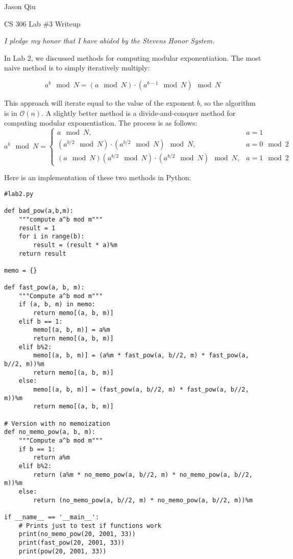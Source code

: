 \documentclass[a4paper,10pt]{article}
\begin{document}
Jason Qiu

CS 306 Lab $\#3$ Writeup

\emph{I pledge my honor that I have abided by the Stevens Honor System.}

In Lab 2, we discussed methods for computing modular exponentiation. The most naive method is to simply iteratively multiply:

$$a^b \mod N = (a \mod N) \cdot (a^{b-1} \mod N) \mod N$$

This approach will iterate equal to the value of the exponent $b$, so the algorithm is in $\mathcal{O}(n)$. A slightly better method is a divide-and-conquer method for computing modular exponentiation. The process is as follows:
\begin{equation*}
a^b \mod N = 
\begin{cases}
	a \mod N, & a = 1\\
	(a^{b/2} \mod N) \cdot (a^{b/2} \mod N) \mod N, & a = 0 \mod 2\\
	(a \mod N)(a^{b/2} \mod N) \cdot (a^{b/2} \mod N) \mod N, & a = 1 \mod 2
\end{cases}
\end{equation*}

Here is an implementation of these two methods in Python:

\begin{lstlisting}
#lab2.py

def bad_pow(a,b,m):
    """compute a^b mod m"""
    result = 1
    for i in range(b):
        result = (result * a)%m
    return result

memo = {}

def fast_pow(a, b, m):
    """Compute a^b mod m"""
    if (a, b, m) in memo:
        return memo[(a, b, m)]
    elif b == 1:
        memo[(a, b, m)] = a%m
        return memo[(a, b, m)]
    elif b%2:
        memo[(a, b, m)] = (a%m * fast_pow(a, b//2, m) * fast_pow(a, b//2, m))%m
        return memo[(a, b, m)]
    else:
        memo[(a, b, m)] = (fast_pow(a, b//2, m) * fast_pow(a, b//2, m))%m
        return memo[(a, b, m)]

# Version with no memoization
def no_memo_pow(a, b, m):
    """Compute a^b mod m"""
    if b == 1:
        return a%m
    elif b%2:
        return (a%m * no_memo_pow(a, b//2, m) * no_memo_pow(a, b//2, m))%m
    else:
        return (no_memo_pow(a, b//2, m) * no_memo_pow(a, b//2, m))%m

if __name__ == '__main__':
	# Prints just to test if functions work
    print(no_memo_pow(20, 2001, 33))
    print(fast_pow(20, 2001, 33))
    print(pow(20, 2001, 33))
\end{lstlisting}
\end{document}
